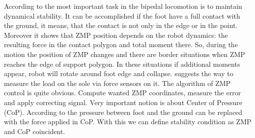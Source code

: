 \documentclass[11pt,a4paper]{article}
\begin{document}
According to \cite{zmp_vuko} the most important task in the bipedal locomotion is to maintain dynamical stability. It can be accomplished if the foot have a full contact with the ground, it means, that the contact is not only in the edge or in the point. Moreover it shows that ZMP position depends on the robot dynamics: the resulting force in the contact polygon and total moment there. So, during the motion the position of ZMP changes and there are border situations when ZMP reaches the edge of support polygon. In these situations if additional moments appear, robot will rotate around foot edge and collapse. \cite{zmp_vuko} suggests the way to measure the load on the sole via force sensors on it. The algorithm of ZMP control is quite obvious. Compute wanted ZMP coordinates, measure the error and apply correcting signal. Very important notion is about Center of Pressure (CoP). According to \cite{zmp_vuko} the pressure between foot and the ground can be replaced with the force applied in CoP. With this we can define stability condition as ZMP and CoP coincident.

\newpage

\begin{thebibliography}{2}
\end{thebibliography}
  
\end{document}
